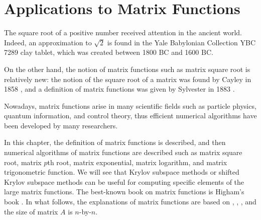 \clearpage\section{{Applications to Matrix Functions}}\label{chap:matrix-functions}
\setcounter{footnote}{0}

{The square root of a positive number received attention in the ancient world. Indeed, an approximation to $\sqrt{2}$ is found in the Yale Babylonian Collection YBC 7289 clay tablet, which was created between 1800 BC and 1600 BC.}

{On the other hand, the notion of matrix functions such as matrix square root is relatively new: the notion of the square root of a matrix was found by Cayley in 1858 , and a definition of matrix functions was given by Sylvester in 1883 .}

{Nowadays, matrix functions arise in many scientific fields such as particle physics, quantum information, and control theory, thus efficient numerical algorithms have been developed by many researchers.}

{In this chapter, the definition of matrix functions is described, and then numerical algorithms of matrix functions are described such as matrix square root, matrix $p$th root, matrix exponential, matrix logarithm, and matrix trigonometric function. We will see that Krylov subspace methods or shifted Krylov subspace methods can be useful for computing specific elements of the large matrix functions. The best-known book on matrix functions is Higham's book . In what follows, the explanations of matrix functions are based on , , , and the size of matrix $A$ is $n$-by-$n$.}
